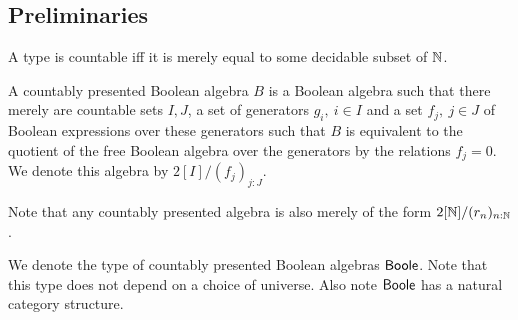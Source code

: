 \subsection{Preliminaries}
%
\begin{definition}
  A type is countable iff it is 
  merely equal to some decidable subset of $\mathbb{N}$. 
\end{definition}
\begin{definition}
  A countably presented Boolean algebra $B$ is a Boolean algebra such that there merely are 
  countable sets $I,J$, 
  a set of generators $g_i,~{i\in I}$ and a set $f_j,~{j\in J}$ 
  of Boolean expressions over these generators 
  such that $B$ is equivalent to the quotient of the free Boolean 
  algebra over the generators by the relations
  $f_j=0$. We denote this algebra by $2[I]/(f_j)_{j:J}$.
\end{definition} 
\begin{remark}\label{BooleAsCQuotient}
Note that any countably presented algebra is also merely of the form 
$2[\mathbb{N}]/ (r_n)_{n:\mathbb{N}}$.
\end{remark}



\begin{remark}
  We denote the type of countably presented Boolean algebras $\mathsf{Boole}$. 
  Note that this type does not depend on a choice of universe. 
  Also note $\mathsf{Boole}$ has a natural category structure. 
\end{remark}

